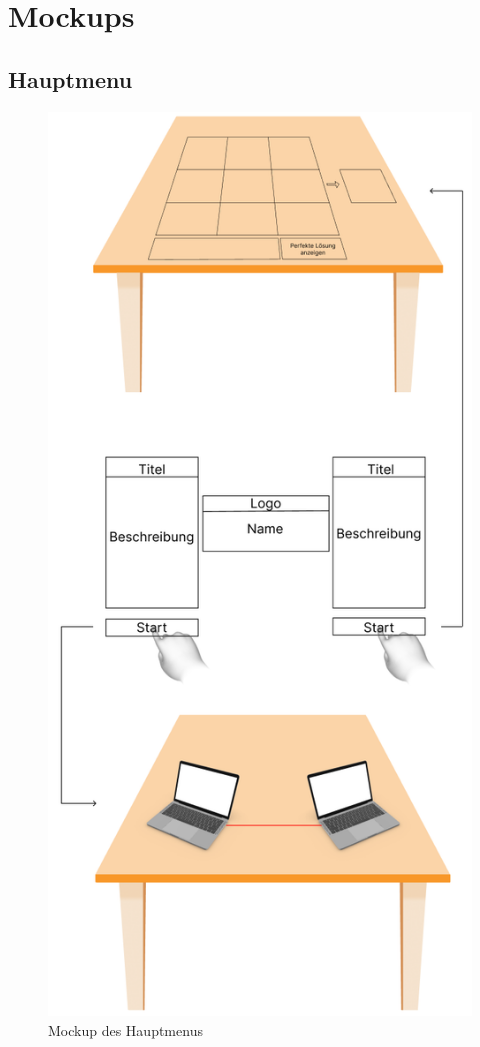 \chapter{Mockups}

\section{Hauptmenu}
\begin{figure}[htbp]
    \centering
    \includegraphics[scale=0.50]{images/HauptmenuMockup}
    \caption{Mockup des Hauptmenus}
\end{figure}
\newpage

